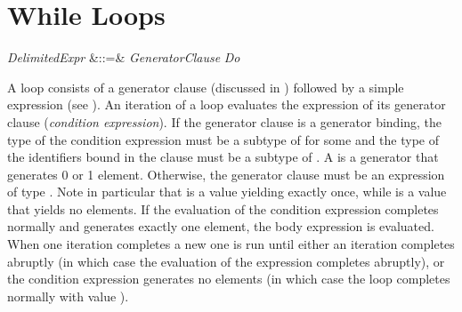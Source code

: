 %
%
%
%

\section{While Loops}

\begin{Grammar}
\emph{DelimitedExpr} &::=&
 \emph{GeneratorClause} \emph{Do} \\

\end{Grammar}

A  loop consists of a generator clause
(discussed in ) followed by a simple  expression
(see ).
An iteration of a  loop evaluates the expression of its generator
clause (\emph{condition expression}).  If the generator clause is a generator
binding, the type of the condition expression must be a subtype of
 for some 
and the type of the identifiers bound in the clause must be a subtype of .
A  is a generator that generates 0 or 1 element.
Otherwise, the generator clause must be an expression of type .
Note in particular that  is a  value yielding \EXP{()}
exactly once, while  is a  value that yields no elements.
If the evaluation of the condition expression completes normally and generates
exactly one element, the body expression is evaluated.
When one iteration completes a new one is run until either an iteration
completes abruptly (in which case the evaluation of the  expression
completes abruptly), or the condition expression generates no elements
(in which case the  loop completes normally with value \EXP{()}).
